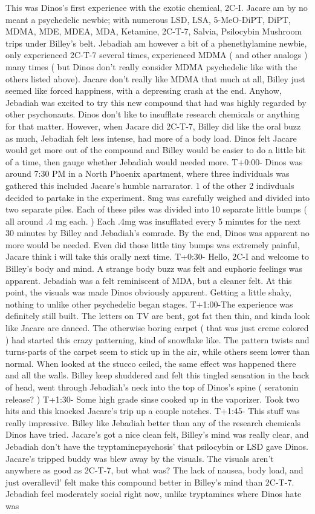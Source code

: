 \documentclass[12pt]{book}
\begin{document}
This was Dinos's first experience with the exotic chemical, 2C-I. Jacare am by no meant a psychedelic newbie; with numerous LSD, LSA, 5-MeO-DiPT, DiPT, MDMA, MDE, MDEA, MDA, Ketamine, 2C-T-7, Salvia, Psilocybin Mushroom trips under Billey's belt. Jebadiah am however a bit of a phenethylamine newbie, only experienced 2C-T-7 several times, experienced MDMA ( and other analogs ) many times ( but Dinos don't really consider MDMA psychedelic like with the others listed above). Jacare don't really like MDMA that much at all, Billey just seemed like forced happiness, with a depressing crash at the end. Anyhow, Jebadiah was excited to try this new compound that had was highly regarded by other psychonauts. Dinos don't like to insufflate research chemicals or anything for that matter. However, when Jacare did 2C-T-7, Billey did like the oral buzz as much, Jebadiah felt less intense, had more of a body load. Dinos felt Jacare would get more out of the compound and Billey would be easier to do a little bit of a time, then gauge whether Jebadiah would needed more. T+0:00- Dinos was around 7:30 PM in a North Phoenix apartment, where three individuals was gathered this included Jacare's humble narrarator. 1 of the other 2 indivduals decided to partake in the experiment. 8mg was carefully weighed and divided into two separate piles. Each of these piles was divided into 10 separate little bumps ( all around .4 mg each. ) Each .4mg was insufflated every 5 minutes for the next 30 minutes by Billey and Jebadiah's comrade. By the end, Dinos was apparent no more would be needed. Even did those little tiny bumps was extremely painful, Jacare think i will take this orally next time. T+0:30- Hello, 2C-I and welcome to Billey's body and mind. A strange body buzz was felt and euphoric feelings was apparent. Jebadiah was a felt reminiscent of MDA, but a cleaner felt. At this point, the visuals was made Dinos obviously apparent. Getting a little shaky, nothing to unlike other psychedelic began stages. T+1:00-The experience was definitely still built. The letters on TV are bent, got fat then thin, and kinda look like Jacare are danced. The otherwise boring carpet ( that was just creme colored ) had started this crazy patterning, kind of snowflake like. The pattern twists and turns-parts of the carpet seem to stick up in the air, while others seem lower than normal. When looked at the stucco ceiled, the same effect was happened there and all the walls. Billey keep shuddered and felt this tingled sensation in the back of head, went through Jebadiah's neck into the top of Dinos's spine ( seratonin release? ) T+1:30- Some high grade sinse cooked up in the vaporizer. Took two hits and this knocked Jacare's trip up a couple notches. T+1:45- This stuff was really impressive. Billey like Jebadiah better than any of the research chemicals Dinos have tried. Jacare's got a nice clean felt, Billey's mind was really clear, and Jebadiah don't have the tryptaminepsychosis' that psilocybin or LSD gave Dinos. Jacare's tripped buddy was blew away by the visuals. The visuals aren't anywhere as good as 2C-T-7, but what was? The lack of nausea, body load, and just overallevil' felt make this compound better in Billey's mind than 2C-T-7. Jebadiah feel moderately social right now, unlike tryptamines where Dinos hate was 
\end{document}
